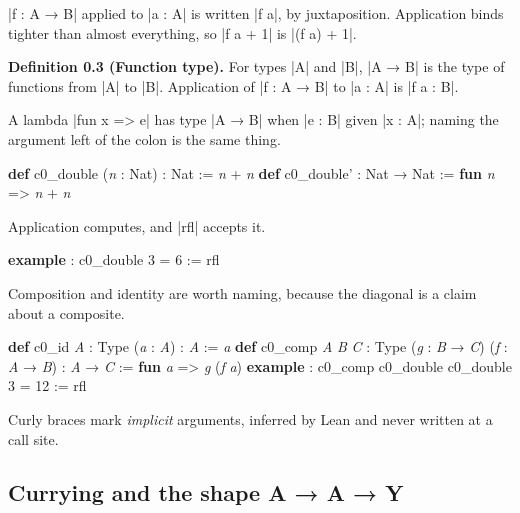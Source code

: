 \documentclass{memoir}
\begin{document}
\LeanVerb|f : A → B| applied to \LeanVerb|a : A| is written \LeanVerb|f a|, by juxtaposition. Application
binds tighter than almost everything, so \LeanVerb|f a + 1| is \LeanVerb|(f a) + 1|.

\textbf{Definition 0.3 (Function type).} For types \LeanVerb|A| and \LeanVerb|B|, \LeanVerb|A → B| is the type of
functions from \LeanVerb|A| to \LeanVerb|B|. Application of \LeanVerb|f : A → B| to \LeanVerb|a : A| is \LeanVerb|f a : B|.

A lambda \LeanVerb|fun x => e| has type \LeanVerb|A → B| when \LeanVerb|e : B| given \LeanVerb|x : A|; naming the
argument left of the colon is the same thing.

\begin{LeanVerbatim}
\textbf{def} c0_double (\textit{n} : Nat) : Nat := \textit{n} + \textit{n}
\textbf{def} c0_double' : Nat → Nat := \textbf{fun} \textit{n} => \textit{n} + \textit{n}

\end{LeanVerbatim}


Application computes, and \LeanVerb|rfl| accepts it.

\begin{LeanVerbatim}
\textbf{example} : c0_double 3 = 6 := rfl

\end{LeanVerbatim}


Composition and identity are worth naming, because the diagonal is a claim about
a composite.

\begin{LeanVerbatim}
\textbf{def} c0_id \textit{A} : Type (\textit{a} : \textit{A}) : \textit{A} := \textit{a}
\textbf{def} c0_comp \textit{A} \textit{B} \textit{C} : Type (\textit{g} : \textit{B} → \textit{C})
    (\textit{f} : \textit{A} → \textit{B}) : \textit{A} → \textit{C} := \textbf{fun} \textit{a} => \textit{g} (\textit{f} \textit{a})
\textbf{example} : c0_comp c0_double c0_double 3 = 12 := rfl

\end{LeanVerbatim}


Curly braces mark \emph{implicit} arguments, inferred by Lean and never written at a
call site.



\subsection{Currying and the shape A → A → Y}\label{Two--Schemas--of--Impossibility-005F-005F-005F--Machine--Checked--Limits--of--Trustworthy--Machine--Learning-005F-005F-005F--and--Why--They--Tighten--with--Capability----Preliminaries----How--to--read--the--Lean--4----Currying--and--the--shape--A---005FARR-005F--A---005FARR-005F--Y}
\end{document}
